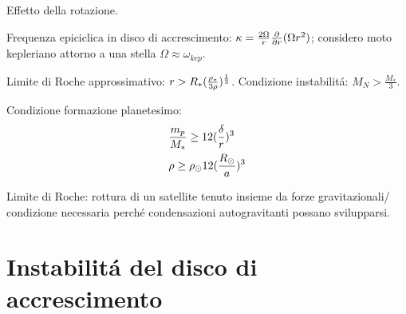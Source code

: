 \begin{wordonframe}{Effetto della rotazione.}

Frequenza epiciclica in disco di accrescimento: $\kappa=\frac{2\Omega}{r}\frac{\partial}{\partial r}(\Omega r^2)$; considero moto kepleriano attorno a una stella $\Omega\approx\omega_{kep}$.

Limite di Roche approssimativo: $r>R_*(\frac{\rho_*}{3\rho})^{\frac{1}{3}}$. Condizione instabilit\'a: $M_{N}>\frac{M_*}{3}$.

Condizione formazione planetesimo:
\begin{align*}
&\frac{m_p}{M_*}\geq12(\frac{\delta}{r})^3\\
&\rho\geq\rho_{\odot}12(\frac{R_{\odot}{}}{a})^3
\end{align*}

Limite di Roche: rottura di un satellite tenuto insieme da forze gravitazionali/ condizione necessaria perch\'e condensazioni autogravitanti possano svilupparsi.

\end{wordonframe}

\section{Instabilit\'a del disco di accrescimento}

